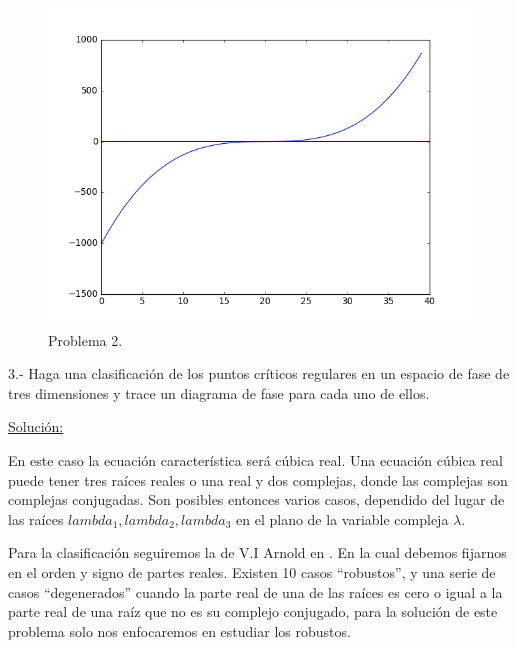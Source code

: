 \documentclass[a4paper,10pt]{article}
\begin{document}
\begin{figure}[h!]
 \centering
\includegraphics[scale=0.3]{problema2fig1}
\caption{Problema 2.}
\label{fig:problema2fig1}
\end{figure}



\vspace{.3cm}

3.- Haga una clasificación de los puntos críticos regulares en un espacio de fase 
de tres dimensiones y trace un diagrama de fase para cada uno de ellos.

\vspace{.3cm}

\underline{Solución:}\vspace{.3cm}

En este caso la ecuación característica será cúbica real. Una ecuación cúbica real puede
tener tres raíces reales o una real y dos complejas, donde las complejas son complejas conjugadas.
Son posibles entonces varios casos, dependido del lugar de las raíces $lambda_1, lambda_2, lambda_3$
en el plano de la variable compleja $\lambda$.

Para la clasificación seguiremos la de V.I Arnold en \cite{arnold}. En la cual debemos
fijarnos en el orden y signo de partes reales. Existen 10 casos ``robustos'', y una 
serie de casos ``degenerados'' cuando la parte real de una de las raíces es cero
o igual a la parte real de una raíz que no es su complejo conjugado, para la 
solución de este problema solo nos enfocaremos en estudiar los robustos. 
\end{document}
